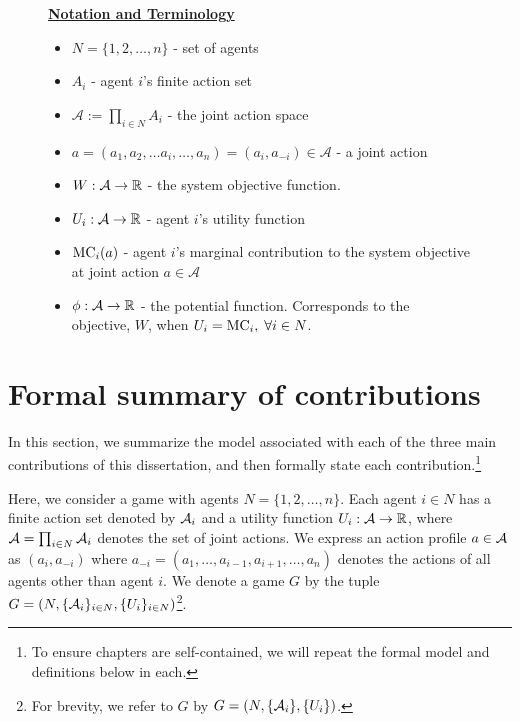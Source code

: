 \begin{figure}
\vspace{.15in}
\begin{mdframed}
\underline{\textbf{Notation and Terminology}}
\begin{itemize}
    \item $N = \{1,2,\ldots,n\}$ - set of agents
    \item $A_i$ - agent $i$'s finite action set
    \item $\mathcal{A}:=\prod_{i\in N} A_i$ - the joint action space
    \item $a = (a_1,a_2,\ldots a_i,\ldots,a_n) = (a_i,a_{-i})\in\mathcal{A}$ - a joint action
    \item $W:\mathcal{A}\to\mathbb{R}$ - the system objective function. 
    \item $U_i:\mathcal{A}\to\mathbb{R}$ - agent $i$'s utility function
    \item ${\rm MC}_i(a)$ - agent $i$'s marginal contribution to the system objective at joint action $a\in \mathcal{A}$
    \item $\phi:\mathcal{A}\to \mathbb{R}$ - the potential function. Corresponds to the objective, $W$, when $U_i = {\rm MC}_i,\;\forall i\in N$.
\end{itemize}
\end{mdframed}
\end{figure}

\section{Formal summary of contributions}

In this section, we summarize the model associated with each of the three main contributions of this dissertation, and then formally state each contribution.\footnote{To ensure chapters are self-contained, we will repeat the formal model and definitions below in each.}



Here, we consider a game with agents $N = \{1,2,\ldots,n\}$. Each agent $i \in N$ has a finite action set denoted by ${\cal A}_i$ and a utility function $U_i : {\cal A} \rightarrow \mathbb{R}$, where ${\cal A} = \prod_{i \in N} {\cal A}_i$ denotes the set of joint actions.   We express an action profile $a \in {\cal A}$ as $(a_i,a_{-i})$ where $a_{-i} = (a_1,\ldots,a_{i-1},a_{i+1},\ldots, a_n)$ denotes the actions of all agents other than agent $i$.  We denote a game $G$ by the tuple $G = \left(N, \{{\cal A}_i\}_{i\in N}, \{U_i\}_{i \in N}\right)$\footnote{For brevity, we refer to $G$ by $G = \left(N, \{{\cal A}_i\}, \{U_i\}\right)$. }.  



